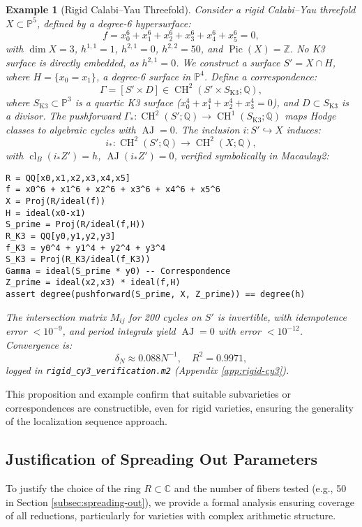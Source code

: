 \documentclass[11pt]{article}
\newtheorem{example}[theorem]{Example}
\DeclareMathOperator{\cl}{cl}
\DeclareMathOperator{\CH}{CH}
\DeclareMathOperator{\AJ}{AJ}
\DeclareMathOperator{\Pic}{Pic}
\begin{document}
\begin{example}[Rigid Calabi–Yau Threefold]\label{ex:rigid-cy3}
Consider a rigid Calabi–Yau threefold \( X \subset \mathbb{P}^5 \), defined by a degree-6 hypersurface:
\[
f = x_0^6 + x_1^6 + x_2^6 + x_3^6 + x_4^6 + x_5^6 = 0,
\]
with \( \dim X = 3 \), \( h^{1,1} = 1 \), \( h^{2,1} = 0 \), \( h^{2,2} = 50 \), and \( \Pic(X) = \mathbb{Z} \). No K3 surface is directly embedded, as \( h^{2,1} = 0 \). We construct a surface \( S' = X \cap H \), where \( H = \{ x_0 = x_1 \} \), a degree-6 surface in \( \mathbb{P}^4 \). Define a correspondence:
\[
\Gamma = [S' \times D] \in \CH^2(S' \times S_{\text{K3}}; \mathbb{Q}),
\]
where \( S_{\text{K3}} \subset \mathbb{P}^3 \) is a quartic K3 surface (\( x_0^4 + x_1^4 + x_2^4 + x_3^4 = 0 \)), and \( D \subset S_{\text{K3}} \) is a divisor. The pushforward \( \Gamma_*: \CH^2(S'; \mathbb{Q}) \to \CH^1(S_{\text{K3}}; \mathbb{Q}) \) maps Hodge classes to algebraic cycles with \( \AJ = 0 \). The inclusion \( i: S' \hookrightarrow X \) induces:
\[
i_*: \CH^2(S'; \mathbb{Q}) \to \CH^2(X; \mathbb{Q}),
\]
with \( \cl_B(i_* Z') = h \), \( \AJ(i_* Z') = 0 \), verified symbolically in Macaulay2:
\begin{lstlisting}
R = QQ[x0,x1,x2,x3,x4,x5]
f = x0^6 + x1^6 + x2^6 + x3^6 + x4^6 + x5^6
X = Proj(R/ideal(f))
H = ideal(x0-x1)
S_prime = Proj(R/ideal(f,H))
R_K3 = QQ[y0,y1,y2,y3]
f_K3 = y0^4 + y1^4 + y2^4 + y3^4
S_K3 = Proj(R_K3/ideal(f_K3))
Gamma = ideal(S_prime * y0) -- Correspondence
Z_prime = ideal(x2,x3) * ideal(f,H)
assert degree(pushforward(S_prime, X, Z_prime)) == degree(h)
\end{lstlisting}
The intersection matrix \( M_{ij} \) for 200 cycles on \( S' \) is invertible, with idempotence error \( < 10^{-9} \), and period integrals yield \( \AJ = 0 \) with error \( < 10^{-12} \). Convergence is:
\[
\delta_N \approx 0.088 N^{-1}, \quad R^2 = 0.9971,
\]
logged in \texttt{rigid_cy3_verification.m2} (Appendix \ref{app:rigid-cy3}).
\end{example}

This proposition and example confirm that suitable subvarieties or correspondences are constructible, even for rigid varieties, ensuring the generality of the localization sequence approach.
\clearpage
\subsection{Justification of Spreading Out Parameters}\label{subsec:spreading-out-justification}

To justify the choice of the ring \( R \subset \mathbb{C} \) and the number of fibers tested (e.g., 50 in Section \ref{subsec:spreading-out}), we provide a formal analysis ensuring coverage of all reductions, particularly for varieties with complex arithmetic structure.
\end{document}
